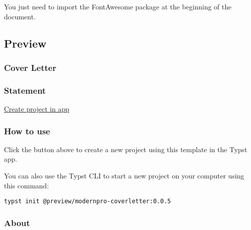 You just need to import the FontAwesome package at the beginning of the
document.

\begin{Shaded}
\begin{Highlighting}[]
\end{Highlighting}
\end{Shaded}

\subsection{Preview}\label{preview}

\subsubsection{Cover Letter}\label{cover-letter-1}


\subsubsection{Statement}\label{statement-1}


\href{/app?template=modernpro-coverletter&version=0.0.5}{Create project
in app}

\subsubsection{How to use}\label{how-to-use-1}

Click the button above to create a new project using this template in
the Typst app.

You can also use the Typst CLI to start a new project on your computer
using this command:

\begin{verbatim}
typst init @preview/modernpro-coverletter:0.0.5
\end{verbatim}



\subsubsection{About}\label{about}

